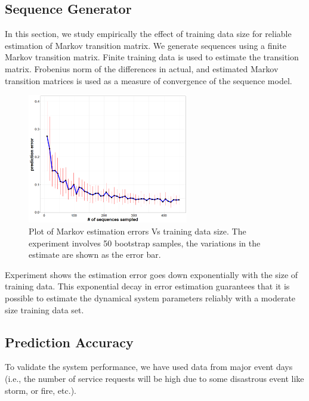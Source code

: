 \documentclass[twoside,leqno,twocolumn]{article}
\begin{document}
\subsection{Sequence Generator}
In this section, we study empirically the effect of training data size for reliable estimation of Markov transition matrix. We generate sequences using a finite Markov transition matrix. Finite training data is used to estimate the transition matrix. Frobenius norm of the differences in actual, and estimated Markov transition matrices is used as a measure of convergence of the sequence model. 

\begin{figure}[t]
    \centering
	\includegraphics[width=7cm]{markov_sequence}
	\caption{Plot of Markov estimation errors Vs training data size. The experiment involves 50 bootstrap samples, the variations in the estimate are shown as the error bar.}
    \label{fig5}
\end{figure}

Experiment shows the estimation error goes down exponentially with the size of training data. This exponential decay in error estimation guarantees that it is possible to estimate the dynamical system parameters reliably with a moderate size training data set.

\subsection{Prediction Accuracy}
To validate the system performance, we have used data from major event days (i.e., the number of service requests will be high due to some disastrous event like storm, or fire, etc.). 
\end{document}
